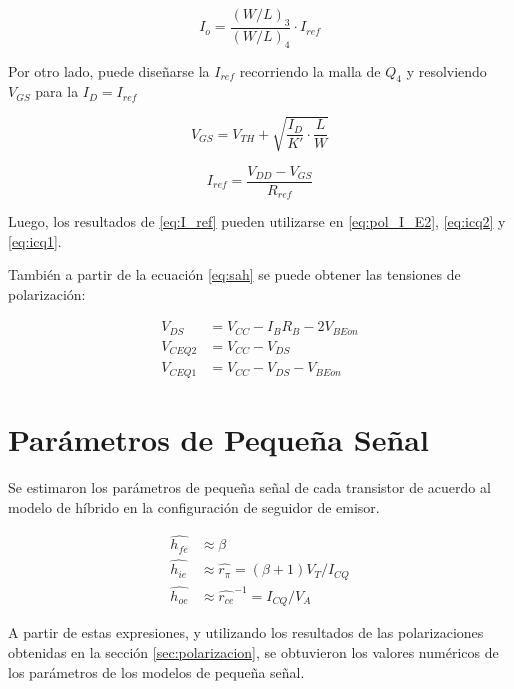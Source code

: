 \begin{equation}
    I_o = \frac{(W/L)_3}{(W/L)_4} \cdot I_{ref}
\end{equation}

Por otro lado, puede diseñarse la $I_{ref}$ recorriendo la malla de $Q_4$ y resolviendo $V_{GS}$ para la $I_D = I_{ref}$

\begin{equation}
    V_{GS} = V_{TH} + \sqrt{\frac{I_D}{K'}\cdot\frac{L}{W}}
\end{equation}

\begin{equation}
    I_{ref}=\frac{V_{DD}-V_{GS}}{R_{ref}}
    \label{eq:I_ref}
\end{equation}

Luego, los resultados de \eqref{eq:I_ref} pueden utilizarse en \eqref{eq:pol_I_E2}, \eqref{eq:icq2} y \eqref{eq:icq1}.

También a partir de la ecuación	 \eqref{eq:sah} se puede obtener las tensiones de polarización:

\begin{align}
    V_{DS} &= V_{CC} - I_B R_B - 2V_{BEon} \\
    V_{CEQ2} &= V_{CC} - V_{DS} \\
    V_{CEQ1} &= V_{CC} - V_{DS} - V_{BEon}
\end{align}

\section{Parámetros de Pequeña Señal}

Se estimaron los parámetros de pequeña señal de cada transistor de acuerdo al modelo de híbrido en la configuración de seguidor de emisor.

\begin{align}
    \hat{h_{fe}} &\approx \beta \\
    \hat{h_{ie}} &\approx \hat{r_\pi} = (\beta+1) V_T/I_{CQ} \\
    \hat{h_{oe}} &\approx \hat{r_{ce}}^{-1} = I_{CQ}/V_A
\end{align}


A partir de estas expresiones, y utilizando los resultados de las polarizaciones obtenidas en la sección \ref{sec:polarizacion}, se obtuvieron los valores numéricos de los parámetros de los modelos de pequeña señal.

